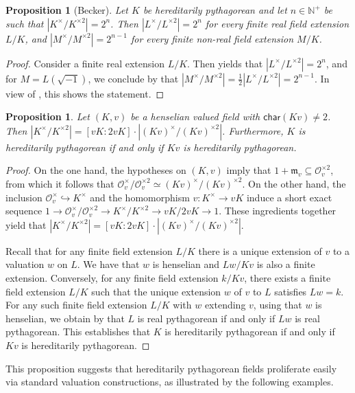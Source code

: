 \documentclass[12pt,leqno]{amsart}
\newcommand{\nat}{\mathbb{N}}
\newcommand{\mc}[1]{\mathcal{#1}}
\newcommand{\mg}[1]{#1^{\times}}
\newcommand{\sq}[1]{#1^{\times 2}}
\newcommand{\scg}[1]{\mg{#1}/\sq{#1}}
\newcommand{\mfm}{\mathfrak{m}}
\newcommand{\car}{\mathsf{char}}
\numberwithin{equation}{section}
\newtheorem{prop}[equation]{Proposition}
\theoremstyle{definition}
\theoremstyle{plain}
\begin{document}
\begin{prop}[Becker]\label{P:hp-scg}
Let $K$ be hereditarily pythagorean and let $n\in\nat^+$ be such that $|\scg{K}|=2^{n}$.
Then 
$|\scg{L}|=2^n$ for every finite real field extension $L/K$, and $|\scg{M}|=2^{n-1}$ for every finite non-real field extension $M/K$.
\end{prop}

\begin{proof}
Consider a finite real extension $L/K$. 
Then \cite[Chap.~III, Theorem 18]{Bec78} yields that $|\scg{L}|=2^n$, and for $M=L(\sqrt{-1})$, we conclude by \cite[Chap.~III, Theorem 12]{Bec78} that $|\scg{M}|=\frac{1}2 |\scg{L}|=2^{n-1}$.
In view of , this shows the statement.
 \end{proof}

\begin{prop}\label{P:hens-scg-hp}
Let $(K,v)$ be a henselian valued field with $\car (Kv)\neq 2$.
Then $|\scg{K}|=[vK:2vK]\cdot |\scg{(Kv)}|$.
Furthermore, $K$ is hereditarily pythagorean if and only if $Kv$ is hereditarily pythagorean.
\end{prop}

    \begin{proof}
On the one hand, the hypotheses on $(K,v)$ imply that $1+\mfm_v\subseteq\sq{\mc{O}_v}$, from which it follows that $\scg{\mc{O}_v}\simeq \scg{(Kv)}$.
On the other hand, the inclusion $\mg{\mc{O}}_v\hookrightarrow \mg{K}$ and the homomorphism $v: \mg{K} \to vK$ induce a short exact sequence $1\to \scg{\mc{O}_v}\to \scg{K}\to vK/2vK\to 1$.
These ingredients together yield that $|\scg{K}|=[vK:2vK]\cdot |\scg{(Kv)}|$.

Recall that for any finite field extension $L/K$ there is a unique extension of $v$ to a valuation $w$ on $L$.
We have that $w$ is henselian and $Lw/Kv$ is also a finite extension.
Conversely, for any finite field extension $k/Kv$, there exists a finite field extension $L/K$ such that the unique extension $w$ of $v$ to $L$ satisfies $Lw = k$.
For any such finite field extension $L/K$ with $w$ extending $v$, using that $w$ is henselian, we obtain by  that $L$ is real pythagorean if and only if $Lw$ is real pythagorean.
This establishes that $K$ is  hereditarily pythagorean if and only if $Kv$ is hereditarily pythagorean.
\end{proof}
    
This proposition suggests that hereditarily pythagorean fields proliferate easily via standard valuation constructions, as illustrated by the following examples.
\end{document}
